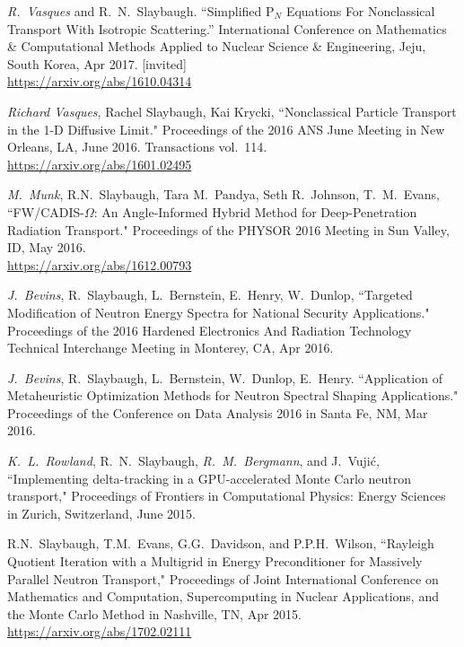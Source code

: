 \begin{bibsection}
\item \textit{R.\ Vasques} and R.\ N.\ Slaybaugh. ``Simplified P$_N$ Equations For Nonclassical Transport With Isotropic Scattering.'' International Conference on Mathematics \& Computational Methods Applied to Nuclear Science \& Engineering, Jeju, South Korea, Apr 2017. [invited]\\
\url{https://arxiv.org/abs/1610.04314}

\item \textit{Richard Vasques}, Rachel Slaybaugh, Kai Krycki, ``Nonclassical Particle Transport in the 1-D Diffusive Limit." Proceedings of the 2016 ANS June Meeting in New Orleans, LA, June 2016. Transactions vol.\ 114.\\
\url{https://arxiv.org/abs/1601.02495}

\item \textit{M.\ Munk}, R.N.\ Slaybaugh, Tara M.~Pandya, Seth R.~Johnson, T.~M.~Evans, ``FW/CADIS-$\Omega$: An Angle-Informed Hybrid Method for Deep-Penetration Radiation Transport." Proceedings of the PHYSOR 2016 Meeting in Sun Valley, ID, May 2016.\\
\url{https://arxiv.org/abs/1612.00793}

\item \textit{J.\ Bevins}, R.\ Slaybaugh, L.\ Bernstein, E.\ Henry, W.\ Dunlop, ``Targeted Modification of Neutron Energy Spectra for National Security Applications." Proceedings of the 2016 Hardened Electronics And Radiation Technology Technical Interchange Meeting in Monterey, CA, Apr 2016. 

\item \textit{J.\ Bevins}, R.\ Slaybaugh, L.\ Bernstein, W.\ Dunlop, E.\ Henry. ``Application of Metaheuristic Optimization Methods for Neutron Spectral Shaping Applications." Proceedings of the Conference on Data Analysis 2016 in Santa Fe, NM, Mar 2016. 

\item \textit{K.\ L.\ Rowland}, R.\ N.\ Slaybaugh, \textit{R.\ M.\ Bergmann}, and J.\ Vuji\'c, ``Implementing delta-tracking in a GPU-accelerated Monte Carlo neutron transport," Proceedings of Frontiers in Computational Physics: Energy Sciences in Zurich, Switzerland, June 2015. 

\item  R.N.\ Slaybaugh, T.M.\ Evans, G.G.\ Davidson, and P.P.H.\ Wilson, ``Rayleigh Quotient Iteration with a Multigrid in Energy Preconditioner for Massively Parallel Neutron Transport," Proceedings of Joint International Conference on Mathematics and Computation, Supercomputing in Nuclear Applications, and the Monte Carlo Method in Nashville, TN, Apr 2015.\\
\url{https://arxiv.org/abs/1702.02111}


\end{bibsection}
